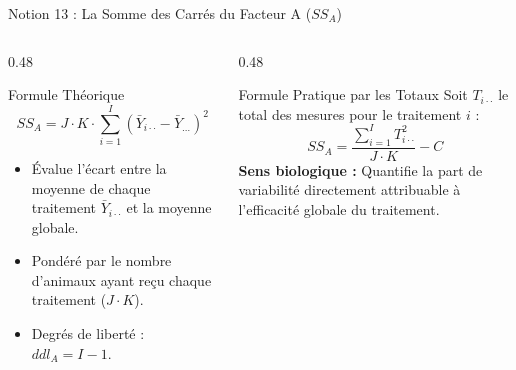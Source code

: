 \documentclass[aspectratio=169,10pt]{beamer}
\begin{document}
\begin{frame}{Notion 13 : La Somme des Carrés du Facteur A ($SS_A$)}
  \begin{columns}[onlytextwidth, T]
    \begin{column}{0.48\linewidth}
      \begin{conceptbox}{Formule Théorique}
        \begin{equation*}
          SS_A = J \cdot K \cdot \sum_{i=1}^I (\bar{Y}_{i\cdot\cdot} - \bar{Y}_{\dots})^2
        \end{equation*}
        \begin{itemize}
          \item Évalue l'écart entre la moyenne de chaque traitement $\bar{Y}_{i\cdot\cdot}$ et la moyenne globale.
          \item Pondéré par le nombre d'animaux ayant reçu chaque traitement ($J \cdot K$).
          \item Degrés de liberté : $ddl_A = I - 1$.
        \end{itemize}
      \end{conceptbox}
    \end{column}
    \begin{column}{0.48\linewidth}
      \begin{takeawaybox}{Formule Pratique par les Totaux}
        Soit $T_{i\cdot\cdot}$ le total des mesures pour le traitement $i$ :
        \begin{equation*}
          SS_A = \frac{\sum_{i=1}^I T_{i\cdot\cdot}^2}{J \cdot K} - C
        \end{equation*}
        \textbf{Sens biologique :} Quantifie la part de variabilité directement attribuable à l'efficacité globale du traitement.
      \end{takeawaybox}
    \end{column}
  \end{columns}
\end{frame}
\end{document}

